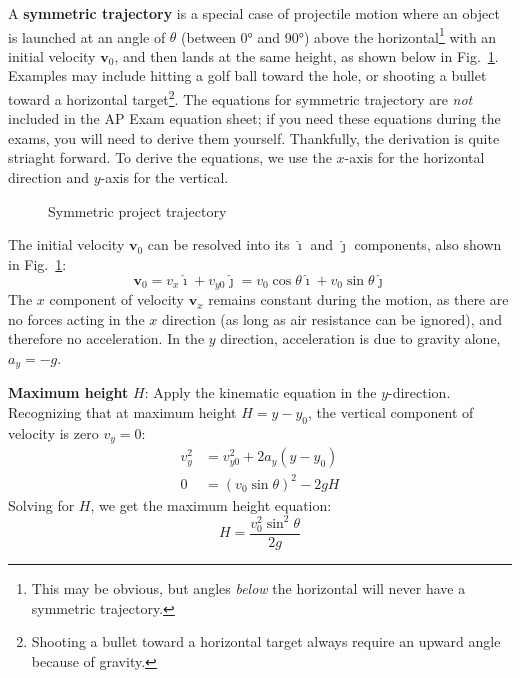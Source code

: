 \documentclass{../../oss-handout}
\newcommand{\mb}[1]{\mathbf{#1}}
\newcommand{\iii}{\bm{\hat{\imath}}}
\newcommand{\jjj}{\bm{\hat{\jmath}}}
\begin{document}
A \textbf{symmetric trajectory} is a special case of projectile motion where an
object is launched at an angle of $\theta$ (between \ang{0} and \ang{90}) above
the horizontal\footnote{This may be obvious, but angles \emph{below} the 
  horizontal will never have a symmetric trajectory.} with an initial velocity
$\mb{v}_0$, and then lands at the same height, as shown below in Fig.~\ref{sym}.
Examples may include hitting a golf ball toward the hole, or shooting a bullet
toward a horizontal target\footnote{Shooting a bullet toward a horizontal
  target always require an upward angle because of gravity.}. The equations for
symmetric trajectory are \emph{not} included in the AP Exam equation sheet; if
you need these equations during the exams, you will need to derive them
yourself. Thankfully, the derivation is quite striaght forward. To derive the
equations, we use the $x$-axis for the horizontal direction and $y$-axis for
the vertical.
\begin{figure}[ht]
  \begin{center}
  \end{center}
  \vspace{-.2in}
  \caption{Symmetric project trajectory}
  \label{sym}
\end{figure}

The initial velocity $\mb{v}_0$ can be resolved into its $\iii$ and $\jjj$
components, also shown in Fig.~\ref{sym}:
\begin{equation}
  \mb{v}_0
  =v_x\iii+v_{y0}\jjj
  =v_0\cos\theta\iii + v_0\sin\theta\jjj
\end{equation}
The $x$ component of velocity $\mb{v}_x$ remains constant during the motion, as
there are no forces acting in the $x$ direction (as long as air resistance can
be ignored), and therefore no acceleration. In the $y$ direction, acceleration
is due to gravity alone, $a_y=-g$.

\textbf{Maximum height} $H$: Apply the kinematic equation in the $y$-direction.
Recognizing that at maximum height $H=y-y_0$, the vertical component of
velocity is zero $v_y=0$:
\begin{align*}
  v_y^2 &= v_{y0}^2 + 2a_y(y-y_0)\\
  0  &= (v_0\sin\theta)^2-2gH
\end{align*}
Solving for $H$, we get the maximum height equation:
\begin{equation}
  \boxed{H=\frac{v_0^2\sin^2\theta}{2g}}
\end{equation}
\end{document}
